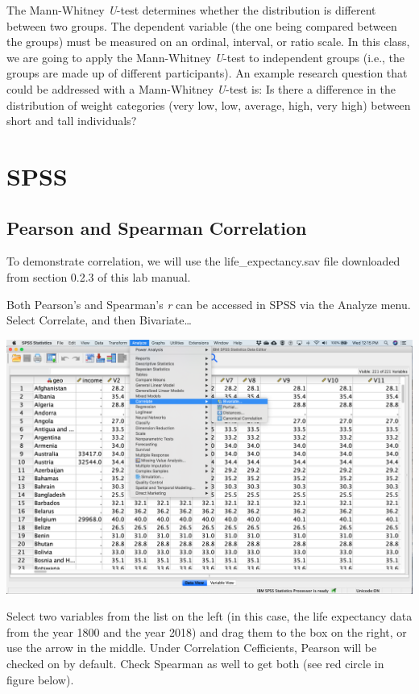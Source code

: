 \documentclass[
]{book}
\begin{document}
The Mann-Whitney \emph{U}-test determines whether the distribution is different between two groups. The dependent variable (the one being compared between the groups) must be measured on an ordinal, interval, or ratio scale. In this class, we are going to apply the Mann-Whitney \emph{U}-test to independent groups (i.e., the groups are made up of different participants). An example research question that could be addressed with a Mann-Whitney \emph{U}-test is: Is there a difference in the distribution of weight categories (very low, low, average, high, very high) between short and tall individuals?

\hypertarget{spss-11}{%
\section{SPSS}\label{spss-11}}

\hypertarget{pearson-and-spearman-correlation}{%
\subsection{Pearson and Spearman Correlation}\label{pearson-and-spearman-correlation}}

To demonstrate correlation, we will use the life\_expectancy.sav file downloaded from section 0.2.3 of this lab manual.

Both Pearson's and Spearman's \emph{r} can be accessed in SPSS via the {Analyze} menu. Select {Correlate}, and then {Bivariate\ldots{}}

\includegraphics{img/12.2.1.png}

Select two variables from the list on the left (in this case, the life expectancy data from the year 1800 and the year 2018) and drag them to the box on the right, or use the arrow in the middle. Under {Correlation Cefficients}, {Pearson} will be checked on by default. Check {Spearman} as well to get both (see red circle in figure below).
\end{document}
